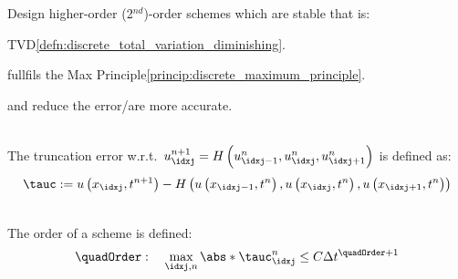 \begin{sectionbox}[Goal]\nospacing
    Design higher-order (2$^{nd}$)-order schemes which are stable that is:
    \begin{circlelist}
        \item TVD\cref{defn:discrete_total_variation_diminishing}.
        \item fullfils the Max Principle\cref{princip:discrete_maximum_principle}.
    \end{circlelist}
    and reduce the error/are more accurate.
\end{sectionbox}
\begin{defnbox}\nospacing
    \begin{defn}\label{defn:truncation_error}\leavevmode\\
        The truncation error w.r.t.\ $u_{\idxj}^{n+1}=H\left(u_{\idxj-1}^{n},u_{\idxj}^{n},u_{\idxj+1}^{n}\right)$
        is defined as:
        \begin{align}
          \tauc:=u \left(x_{\idxj},t^{n+1}\right)-
          H \left(u \left(x_{\idxj-1},t^{n}\right),u \left(x_{\idxj},t^{n}\right),u \left(x_{\idxj+1},t^{n}\right)\right)
        \end{align}
    \end{defn}
\end{defnbox}
\begin{defnbox}\nospacing
    \begin{defn}\label{defn:order_of_scheme}\leavevmode\\
        The order of a scheme is defined:
        \begin{align}
          \quadOrder:\quad\max_{\idxj,n}\abs*{\tauc_{\idxj}^{n}}\leq C\Delta t^{\quadOrder+1}
        \end{align}
    \end{defn}
\end{defnbox}

